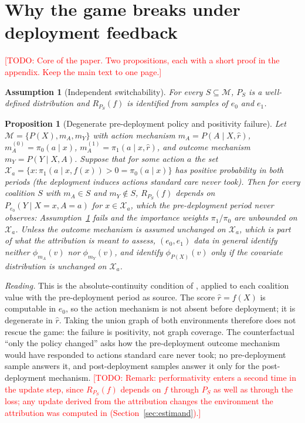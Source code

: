 \documentclass[letterpaper]{article} %
\newtheorem{proposition}{Proposition}
\newtheorem{assumption}{Assumption}
\newcommand{\todo}[1]{\textcolor{red}{[TODO: #1]}}
\newcommand{\rhat}{\hat r}
\begin{document}
\section{Why the game breaks under deployment feedback}
\label{sec:break}

\todo{Core of the paper. Two propositions, each with a short proof in the
appendix. Keep the main text to one page.}

\begin{assumption}[Independent switchability]
\label{ass:switch}
For every $S \subseteq \mathcal{M}$, $P_S$ is a well-defined distribution and
$R_{P_S}(f)$ is identified from samples of $e_0$ and $e_1$.
\end{assumption}

\begin{proposition}[Degenerate pre-deployment policy and positivity failure]
\label{prop:absence}
Let $\mathcal{M} = \{P(X), m_A, m_Y\}$ with action mechanism
$m_A = P(A \mid X, \rhat)$, $m_A^{(0)} = \pi_0(a \mid x)$,
$m_A^{(1)} = \pi_1(a \mid x, \rhat)$, and outcome mechanism
$m_Y = P(Y \mid X, A)$. Suppose that for some action $a$ the set
$\mathcal{X}_a = \{x : \pi_1(a \mid x, f(x)) > 0 = \pi_0(a \mid x)\}$ has positive
probability in both periods (the deployment induces actions standard care never
took). Then for every coalition $S$ with $m_A \in S$ and $m_Y \notin S$,
$R_{P_S}(f)$ depends on $P_{e_0}(Y \mid X = x, A = a)$ for $x \in \mathcal{X}_a$,
which the pre-deployment period never observes: Assumption~\ref{ass:switch}
fails and the importance weights $\pi_1 / \pi_0$ are unbounded on
$\mathcal{X}_a$. Unless the outcome mechanism is assumed unchanged on
$\mathcal{X}_a$, which is part of what the attribution is meant to assess,
$(e_0, e_1)$ data in general identify neither $\phi_{m_A}(v)$ nor
$\phi_{m_Y}(v)$, and identify $\phi_{P(X)}(v)$ only if the covariate
distribution is unchanged on $\mathcal{X}_a$.
\end{proposition}

\noindent\emph{Reading.} This is the absolute-continuity condition of
\citet{boeken2024evaluating}, applied to each coalition value with the
pre-deployment period as source. The score $\rhat = f(X)$ is computable in
$e_0$, so the action mechanism is not absent before deployment; it is
degenerate in $\rhat$. Taking the union graph of both environments therefore
does not rescue the game: the failure is positivity, not graph coverage. The
counterfactual ``only the policy changed'' asks how the pre-deployment outcome
mechanism would have responded to actions standard care never took; no
pre-deployment sample answers it, and post-deployment samples answer it only
for the post-deployment mechanism. \todo{Remark: performativity enters a second time in the update
step, since $R_{P_S}(f)$ depends on $f$ through $P_S$ as well as through the
loss; any update derived from the attribution changes the environment the
attribution was computed in (Section~\ref{sec:estimand}).}
\end{document}
